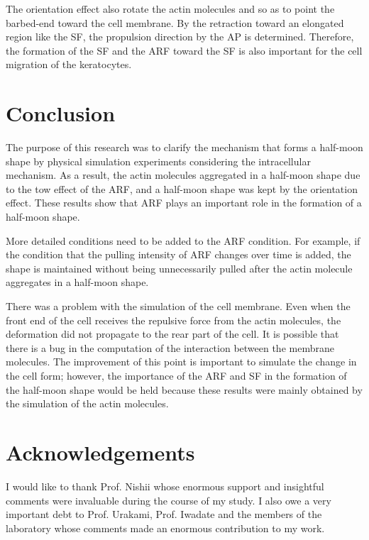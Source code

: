 \documentclass[a4paper,12pt, oneside]{book}
\begin{document}
The orientation effect also rotate the actin molecules and so as to point the barbed-end toward the cell membrane.
By the retraction toward an elongated region like the SF, the propulsion direction by the AP is determined.
Therefore, the formation of the SF and the ARF toward the SF is also important for the cell migration of the keratocytes.

\chapter{Conclusion}
The purpose of this research was to clarify the mechanism that forms a half-moon shape by physical simulation experiments considering the intracellular mechanism.
As a result, the actin molecules aggregated in a half-moon shape due to the tow effect of the ARF, and a half-moon shape was kept by the orientation effect.
These results show that ARF plays an important role in the formation of a half-moon shape.


More detailed conditions need to be added to the ARF condition.
For example, if the condition that the pulling intensity of ARF changes over time is added, the shape is maintained without being unnecessarily pulled after the actin molecule aggregates in a half-moon shape.

There was a problem with the simulation of the cell membrane.
Even when the front end of the cell receives the repulsive force from the actin molecules, the deformation did not propagate to the rear part of the cell.
It is possible that there is a bug in the computation of the interaction between the membrane molecules.
The improvement of this point is important to simulate the change in the cell form; however, the importance of the ARF and SF in the formation of the half-moon shape would be held because these results were mainly obtained by the simulation of the actin molecules.
\chapter*{Acknowledgements}
I would like to thank Prof. Nishii whose enormous support and insightful comments were invaluable during the course of my study. I also owe a very important debt to Prof. Urakami, Prof. Iwadate and the members of the laboratory whose comments made an enormous contribution to my work. 




\end{document}
